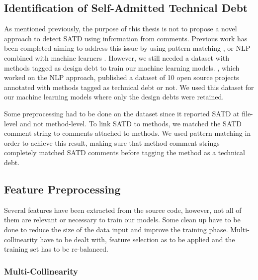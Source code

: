 \subsection{Identification of Self-Admitted Technical Debt}


As mentioned previously, the purpose of this thesis is not to propose a novel approach to detect \ac{SATD} using information from comments. Previous work has been completed aiming to address this issue by using pattern matching \citep{MaldonadoS15}, \citep{PotdarS14} or \ac{NLP} combined with machine learners \citep{maldonado17}. However, we still needed a dataset with methods tagged as design debt to train our machine learning models. \citet{maldonado17}, which worked on the \ac{NLP} approach, published a dataset of 10 open source projects annotated with methods tagged as technical debt or not. We used this dataset for our machine learning models where only the design debts were retained. \par

Some preprocessing had to be done on the dataset since it reported \ac{SATD} at file-level and not method-level. To link \ac{SATD} to methods, we matched the \ac{SATD} comment string to comments attached to methods. We used pattern matching in order to achieve this result, making sure that method comment strings completely matched \ac{SATD} comments before tagging the method as a technical debt.

\subsection{Feature Preprocessing}


Several features have been extracted from the source code, however, not all of them are relevant or necessary to train our models. Some clean up have to be done to reduce the size of the data input and improve the training phase. Multi-collinearity have to be dealt with, feature selection as to be applied and the training set has to be re-balanced.

\subsubsection{Multi-Collinearity}

